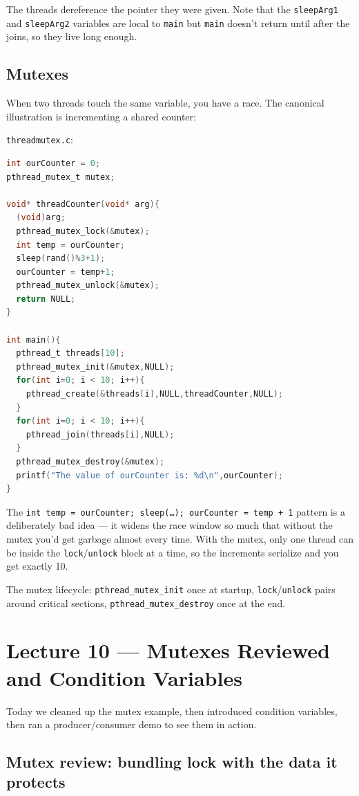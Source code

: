 \documentclass[11pt]{article}
\begin{document}
The threads dereference the pointer they were given. Note that the
\texttt{sleepArg1} and \texttt{sleepArg2} variables are local to
\texttt{main} but \texttt{main} doesn't return until after the joins,
so they live long enough.

\subsection*{Mutexes}

When two threads touch the same variable, you have a race. The
canonical illustration is incrementing a shared counter:

\texttt{threadmutex.c}:

\begin{lstlisting}[language=C]
int ourCounter = 0;
pthread_mutex_t mutex;

void* threadCounter(void* arg){
  (void)arg;
  pthread_mutex_lock(&mutex);
  int temp = ourCounter;
  sleep(rand()%3+1);
  ourCounter = temp+1;
  pthread_mutex_unlock(&mutex);
  return NULL;
}

int main(){
  pthread_t threads[10];
  pthread_mutex_init(&mutex,NULL);
  for(int i=0; i < 10; i++){
    pthread_create(&threads[i],NULL,threadCounter,NULL);
  }
  for(int i=0; i < 10; i++){
    pthread_join(threads[i],NULL);
  }
  pthread_mutex_destroy(&mutex);
  printf("The value of ourCounter is: %d\n",ourCounter);
}
\end{lstlisting}

The \texttt{int temp = ourCounter; sleep(\ldots); ourCounter = temp +
1} pattern is a deliberately bad idea --- it widens the race window
so much that without the mutex you'd get garbage almost every time.
With the mutex, only one thread can be inside the
\texttt{lock}/\texttt{unlock} block at a time, so the increments
serialize and you get exactly 10.

The mutex lifecycle: \texttt{pthread\_mutex\_init} once at startup,
\texttt{lock}/\texttt{unlock} pairs around critical sections,
\texttt{pthread\_mutex\_destroy} once at the end.

\section{Lecture 10 --- Mutexes Reviewed and Condition Variables}

Today we cleaned up the mutex example, then introduced condition
variables, then ran a producer/consumer demo to see them in action.

\subsection*{Mutex review: bundling lock with the data it protects}
\end{document}
